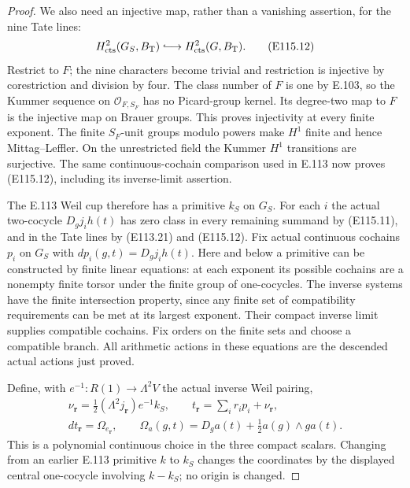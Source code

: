 \begin{proof}
We also need an injective map, rather than a vanishing
assertion, for the nine Tate lines:
\[
 H^2_{\rm cts}(G_S,B_{\rm T})
          \lhook\joinrel\longrightarrow H^2_{\rm cts}(G,B_{\rm T}).
 \tag{E115.12}
\]
Restrict to $F$; the nine characters become trivial and
restriction is injective by corestriction and division by four.
The class number of $F$ is one by E.103, so the Kummer
sequence on $\mathcal O_{F,S_F}$ has no Picard-group kernel.
Its degree-two map to $F$ is the injective map on Brauer
groups.  This proves injectivity at every finite exponent.
The finite $S_F$-unit groups modulo powers make $H^1$
finite and hence Mittag--Leffler.  On the unrestricted field
the Kummer $H^1$ transitions are surjective.
The same continuous-cochain comparison used in E.113 now
proves (E115.12), including its inverse-limit assertion.

The E.113 Weil cup therefore has a primitive $k_S$ on $G_S$.
For each $i$ the actual two-cocycle
$D_g j_i h(t)$ has zero class in every remaining summand
by (E115.11), and in the Tate lines by (E113.21) and
(E115.12).  Fix actual continuous cochains $p_i$ on $G_S$
with $dp_i(g,t)=D_gj_i h(t)$.
Here and below a primitive can be constructed by finite
linear equations: at each exponent its possible cochains
are a nonempty finite torsor under the finite group of
one-cocycles.  The inverse systems have the finite
intersection property, since any finite set of compatibility
requirements can be met at its largest exponent.
Their compact inverse limit supplies compatible cochains.
Fix orders on the finite sets and choose a compatible branch.
All arithmetic actions in these equations are the descended
actual actions just proved.

Define, with $e^{-1}:R(1)\to\Lambda^2V$ the actual inverse
Weil pairing,
\[
 \begin{gathered}
 \nu_{\mathbf r}=\tfrac12(\Lambda^2j_{\mathbf r})e^{-1}k_S,
 \qquad t_{\mathbf r}=\sum_i r_i p_i+\nu_{\mathbf r},\\
 dt_{\mathbf r}=\Omega_{e_{\mathbf r}},\qquad
 \Omega_a(g,t)=D_ga(t)+\tfrac12a(g)\wedge g a(t).
 \end{gathered}
 \tag{E115.13}
\]
This is a polynomial continuous choice in the three compact
scalars.  Changing from an earlier E.113 primitive $k$ to
$k_S$ changes the coordinates by the displayed central
one-cocycle involving $k-k_S$; no origin is changed.


\end{proof}
